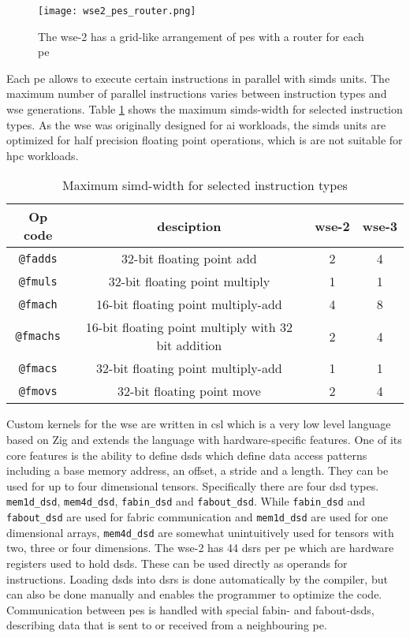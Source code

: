 \begin{figure}[h]
    \centering
    \texttt{[image: wse2\_pes\_router.png]}
    \caption{The \ac{wse}-2 has a grid-like arrangement of \acp{pe} with a router for each \ac{pe} \cite{lie2023cerebras}}
    \label{fig:wse2_pes_router}
\end{figure}

Each \ac{pe} allows to execute certain instructions in parallel with \acp{simd} units. The maximum number of parallel instructions varies between instruction types and \ac{wse} generations. Table \ref{tab:simd_operations} shows the maximum \acp{simd}-width for selected instruction types. As the \ac{wse} was originally designed for \ac{ai} workloads, the \acp{simd} units are optimized for half precision floating point operations, which is are not suitable for \ac{hpc} workloads.

\begin{table}[h]
    \centering
    \caption{Maximum \ac{simd}-width for selected instruction types}
    \label{tab:simd_operations}
    \begin{tabular}{@{}cccc@{}}
        \toprule
        Op code & desciption & \ac{wse}-2 & \ac{wse}-3 \\
        \midrule
        \texttt{@fadds} & 32-bit floating point add & 2 & 4 \\
        \texttt{@fmuls} & 32-bit floating point multiply & 1 & 1 \\
        \texttt{@fmach} & 16-bit floating point multiply-add & 4 & 8 \\
        \texttt{@fmachs} & 16-bit floating point multiply with 32 bit addition & 2 & 4 \\
        \texttt{@fmacs} & 32-bit floating point multiply-add & 1 & 1 \\
        \texttt{@fmovs} & 32-bit floating point move & 2 & 4 \\
        \bottomrule
    \end{tabular}
\end{table}

Custom kernels for the \ac{wse} are written in \ac{csl} which is a very low level language based on Zig and extends the language with hardware-specific features.
One of its core features is the ability to define \acp{dsd} which define data access patterns including a base memory address, an offset, a stride and a length. They can be used for up to four dimensional tensors. Specifically there are four \ac{dsd} types. \texttt{mem1d\_dsd}, \texttt{mem4d\_dsd}, \texttt{fabin\_dsd} and \texttt{fabout\_dsd}. While \texttt{fabin\_dsd} and \texttt{fabout\_dsd} are used for fabric communication and \texttt{mem1d\_dsd} are used for one dimensional arrays, \texttt{mem4d\_dsd} are somewhat unintuitively used for tensors with two, three or four dimensions. The \ac{wse}-2 has 44 \acp{dsr} per \ac{pe} which are hardware registers used to hold \acp{dsd}. These can be used directly as operands for instructions. Loading \acp{dsd} into \acp{dsr} is done automatically by the compiler, but can also be done manually and enables the programmer to optimize the code. Communication between \acp{pe} is handled with special fabin- and fabout-\acp{dsd}, describing data that is sent to or received from a neighbouring \ac{pe}.

